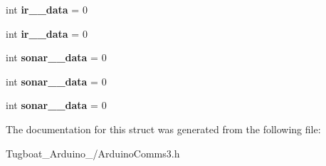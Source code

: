 \begin{DoxyCompactItemize}
\item 
int {\bfseries ir\+\_\+\_\+data} = 0\hypertarget{struct_r_e_c_i_e_v_e___d_a_t_a___s_t_r_u_c_t_u_r_e_a633be90a6ae1f57798dcc9056ad92a4b}{}\label{struct_r_e_c_i_e_v_e___d_a_t_a___s_t_r_u_c_t_u_r_e_a633be90a6ae1f57798dcc9056ad92a4b}

\item 
int {\bfseries ir\+\_\+\_\+data} = 0\hypertarget{struct_r_e_c_i_e_v_e___d_a_t_a___s_t_r_u_c_t_u_r_e_a62fee75f29560c03cc511848be988c9b}{}\label{struct_r_e_c_i_e_v_e___d_a_t_a___s_t_r_u_c_t_u_r_e_a62fee75f29560c03cc511848be988c9b}

\item 
int {\bfseries sonar\+\_\+\_\+data} = 0\hypertarget{struct_r_e_c_i_e_v_e___d_a_t_a___s_t_r_u_c_t_u_r_e_a00e7a748f950d5aef837afbd3f4d2997}{}\label{struct_r_e_c_i_e_v_e___d_a_t_a___s_t_r_u_c_t_u_r_e_a00e7a748f950d5aef837afbd3f4d2997}

\item 
int {\bfseries sonar\+\_\+\_\+data} = 0\hypertarget{struct_r_e_c_i_e_v_e___d_a_t_a___s_t_r_u_c_t_u_r_e_add6c622bdfc96b23e0e8016ee5292cbd}{}\label{struct_r_e_c_i_e_v_e___d_a_t_a___s_t_r_u_c_t_u_r_e_add6c622bdfc96b23e0e8016ee5292cbd}

\item 
int {\bfseries sonar\+\_\+\_\+data} = 0\hypertarget{struct_r_e_c_i_e_v_e___d_a_t_a___s_t_r_u_c_t_u_r_e_a75f5f4198e628949f9cefc3922b921e1}{}\label{struct_r_e_c_i_e_v_e___d_a_t_a___s_t_r_u_c_t_u_r_e_a75f5f4198e628949f9cefc3922b921e1}

\end{DoxyCompactItemize}


The documentation for this struct was generated from the following file\+:\begin{DoxyCompactItemize}
\item 
Tugboat\+\_\+\+Arduino\+\_/Arduino\+Comms3.\+h\end{DoxyCompactItemize}
